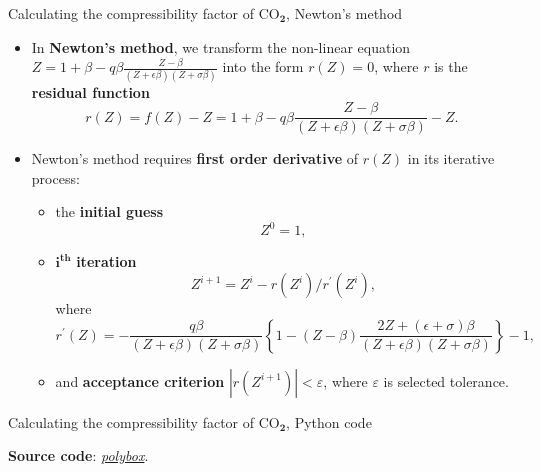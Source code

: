 %
%
\begin{frame}{Calculating the compressibility factor of CO$_{\boldsymbol{2}}$, Newton's method}
\begin{itemize}
\item In \alert{\textbf{Newton's method}}, we transform the non-linear equation
$Z=1+\beta-q\beta\frac{Z-\beta}{(Z+\epsilon\beta)(Z+\sigma\beta)}$
into the form $r(Z)=0$, where $r$ is the \textbf{residual function} 
\[
\boxed{r(Z) 
	= f(Z) - Z 
	= 1+\beta-q\beta\frac{Z-\beta}{(Z+\epsilon\beta)(Z+\sigma\beta)}-Z}.
\]
\item Newton's method requires \textbf{first order derivative} of $r(Z)$ in its iterative process:
\begin{itemize}
\item the \textbf{initial guess} 
\[
Z^{0}=1,
\]
\item $\boldsymbol{i^{\text{th}}}$ \textbf{iteration}
\[
Z^{i+1} =Z^{i}-r(Z^{i})/r^{\prime}(Z^{i}),
\]
where 
%
\[
r^{\prime}(Z)=-\frac{q\beta}{(Z+\epsilon\beta)(Z+\sigma\beta)}\left\{ 1-(Z-\beta)\frac{2Z+(\epsilon+\sigma)\beta}{(Z+\epsilon\beta)(Z+\sigma\beta)}\right\} -1,
\]
%
\item and \textbf{acceptance criterion} $|r(Z^{i+1})|<\varepsilon$, where $\varepsilon$ is selected tolerance.
\end{itemize} 
\end{itemize}
\end{frame}
%
%
\begin{frame}{Calculating the compressibility factor of CO$_{\boldsymbol{2}}$, Python code}



\textbf{Source code}: \href{}{\textcolor{indigo(dye)}{\it polybox}}.

\end{frame}
